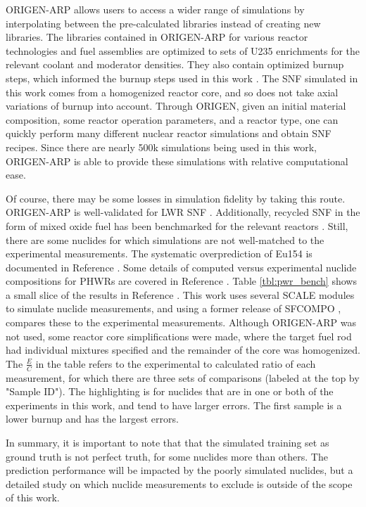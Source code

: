 \gls{ORIGEN-ARP} allows users to access a wider range of simulations by
interpolating between the pre-calculated libraries instead of creating new
libraries.  The libraries contained in \gls{ORIGEN-ARP} for various reactor
technologies and fuel assemblies are optimized to sets of \gls{U235}
enrichments for the relevant coolant and moderator densities.  They also
contain optimized burnup steps, which informed the burnup steps used in this
work \cite{origenarp}.  The \gls{SNF} simulated in this work comes from a
homogenized reactor core, and so does not take axial variations of burnup into
account.  Through \gls{ORIGEN}, given an initial material composition, some
reactor operation parameters, and a reactor type, one can quickly perform many
different nuclear reactor simulations and obtain \gls{SNF} recipes. Since there
are nearly 500k simulations being used in this work, \gls{ORIGEN-ARP} is able
to provide these simulations with relative computational ease. 

Of course, there may be some losses in simulation fidelity by taking this
route.  \gls{ORIGEN-ARP} is well-validated for \gls{LWR} \gls{SNF}
\cite{lwr_valid}.  Additionally, recycled \gls{SNF} in the form of mixed oxide
fuel has been benchmarked for the relevant reactors \cite{mox_valid}.  Still,
there are some nuclides for which simulations are not well-matched to the
experimental measurements. The systematic overprediction of Eu154 is documented
in Reference \cite{skutnik_eu154}.  Some details of computed versus
experimental nuclide compositions for \gls{PHWR}s are covered in Reference
\cite{skutnik_2021}. Table \ref{tbl:pwr_bench} shows a small slice of the
results in Reference \cite{pwr_benchmark_2010}.  This work uses several
\gls{SCALE} modules to simulate nuclide measurements, and using a former
release of \gls{SFCOMPO} \cite{sfcompo, valid_sfco}, compares these to the
experimental measurements.  Although \gls{ORIGEN-ARP} was not used, some
reactor core simplifications were made, where the target fuel rod had
individual mixtures specified and the remainder of the core was homogenized.
The $\frac{E}{C}$ in the table refers to the experimental to calculated ratio
of each measurement, for which there are three sets of comparisons (labeled at
the top by "Sample ID").  The highlighting is for nuclides that are in one or
both of the experiments in this work, and tend to have larger errors.  The
first sample is a lower burnup and has the largest errors.

In summary, it is important to note that that the simulated training set as
ground truth is not perfect truth, for some nuclides more than others.  The
prediction performance will be impacted by the poorly simulated nuclides, but a
detailed study on  which nuclide measurements to exclude is outside of the
scope of this work.

